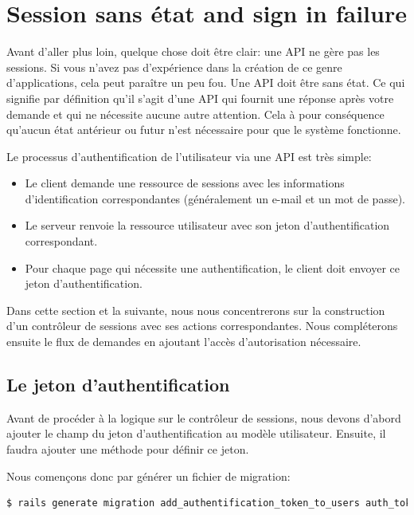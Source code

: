 \documentclass[]{report}
\begin{document}
  \section{Session sans état and sign in failure}

    Avant d'aller plus loin, quelque chose doit être clair: une API ne gère pas les sessions. Si vous n'avez pas d'expérience dans la création de ce genre d'applications, cela peut paraître un peu fou. Une API doit être sans état. Ce qui signifie par définition qu'il s'agit d'une API qui fournit une réponse après votre demande et qui ne nécessite aucune autre attention. Cela à pour conséquence qu'aucun état antérieur ou futur n'est nécessaire pour que le système fonctionne.

    Le processus d'authentification de l'utilisateur via une API est très simple:

    \begin{itemize}
      \item Le client demande une ressource de sessions avec les informations d'identification correspondantes (généralement un e-mail et un mot de passe).
      \item Le serveur renvoie la ressource utilisateur avec son jeton d'authentification correspondant.
      \item Pour chaque page qui nécessite une authentification, le client doit envoyer ce jeton d'authentification.
    \end{itemize}

    Dans cette section et la suivante, nous nous concentrerons sur la construction d'un contrôleur de sessions avec ses actions correspondantes. Nous compléterons ensuite le flux de demandes en ajoutant l'accès d'autorisation nécessaire.

    \subsection{Le jeton d'authentification}

      Avant de procéder à la logique sur le contrôleur de sessions, nous devons d'abord ajouter le champ du jeton d'authentification au modèle utilisateur. Ensuite, il faudra  ajouter une méthode pour définir ce jeton.

      Nous començons donc par générer un fichier de migration:

      \begin{scriptsize}
        \begin{lstlisting}[language=bash]
        $ rails generate migration add_authentification_token_to_users auth_token:string
        \end{lstlisting}
      \end{scriptsize}
\end{document}
